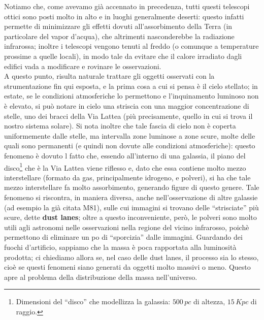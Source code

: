 Notiamo che, come avevamo già accennato in precedenza, tutti questi telescopi ottici sono posti molto in alto e in luoghi generalmente deserti: questo infatti permette di minimizzare gli effetti dovuti all'assorbimento della Terra (in particolare del vapor d'acqua), che altrimenti nasconderebbe la radiazione infrarossa; inoltre i telescopi vengono tenuti al freddo (o comunque a temperature prossime a quelle locali), in modo tale da evitare che il calore irradiato dagli edifici vada a modificare e rovinare le osservazioni.
\\

A questo punto, risulta  naturale trattare gli oggetti osservati con la strumentazione fin qui esposta, e la prima cosa a cui si pensa è il cielo stellato; in estate, se le condizioni atmosferiche lo permettono e l'inquinamento luminoso non è elevato, si può notare in cielo una striscia con una maggior concentrazione di stelle, uno dei bracci della Via Lattea (più precisamente, quello in cui si trova il nostro sistema solare). Si nota inoltre che tale fascia di cielo non è coperta uniformemente dalle stelle, ma intervalla zone luminose a zone scure, molte delle quali sono permanenti (e quindi non dovute alle condizioni atmosferiche): questo fenomeno è dovuto l fatto che, essendo all'interno di una galassia, il piano del disco\footnote{Dimensioni del ``disco'' che modellizza la galassia: $500 \, pc$ di altezza, $15 \, Kpc$ di raggio.} che è la Via Lattea viene riflesso e, dato che essa contiene molto mezzo interstellare (formato da gas, principalmente idrogeno, e polveri), si ha che tale mezzo interstellare fa molto assorbimento, generando figure di questo genere. Tale fenomeno si riscontra, in maniera diversa, anche nell'osservazione di altre galassie (ad esempio la già citata M81), sulle cui immagini si trovano delle ``strisciate'' più scure, dette \textbf{dust lanes}; oltre a questo inconveniente, però, le polveri sono molto utili agli astronomi nelle osservazioni nella regione del vicino infrarosso, poichè permettono di eliminare un po di ``sporcizia'' dalle immagini. Guardando dei fuochi d'artificio, sappiamo che la massa è poca rapportata alla luminosità prodotta; ci chiediamo allora se, nel caso delle dust lanes,  il processo sia lo stesso, cioè se questi fenomeni siano generati da oggetti molto massivi o meno. Questo apre al problema della distribuzione della massa nell'universo.
